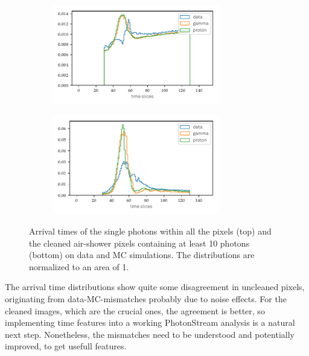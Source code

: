 \begin{figure}
  \begin{subfigure}{\textwidth}
    \centering
    \includegraphics[width=0.8\textwidth]{Plots/all_slices_min_0_per_pixel.pdf}
  \end{subfigure}
  \begin{subfigure}{\textwidth}
    \centering
    \includegraphics[width=0.8\textwidth]{Plots/all_slices_min_10_per_pixel.pdf}
  \end{subfigure}
  \caption{Arrival times of the single photons within all the pixels (top) and the cleaned air-shower pixels containing at least 10 photons (bottom) on data and MC simulations. The distributions are normalized to an area of \num{1}.}
  \label{fig:slices}
\end{figure}
%

The arrival time distributions show quite some disagreement in uncleaned
pixels, originating from data-MC-mismatches probably due to noise effects. For
the cleaned images, which are the crucial ones, the agreement is better, so
implementing time features into a working PhotonStream analysis is a natural
next step. Nonetheless, the mismatches need to be understood and potentially
improved, to get usefull features.

